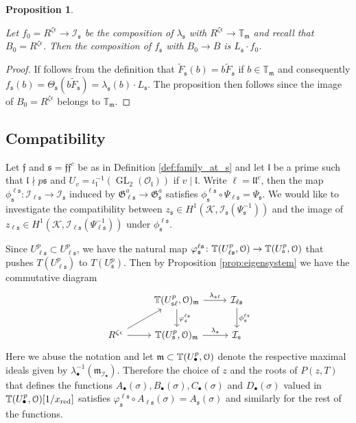 \documentclass[leqno]{amsart}
\newtheorem{prop}[thm]{Proposition}
\theoremstyle{definition}
\theoremstyle{remark}
\newcommand{\oo}{\mathcal{O}}
\newcommand{\eo}{\EuScript{O}}
\DeclareMathOperator{\GL}{GL}
\newcommand{\ff}{\mathfrak{f}}
\newcommand{\fl}{\mathfrak{l}}
\newcommand{\fm}{\mathfrak{m}}
\newcommand{\fs}{\mathfrak{s}}
\newcommand{\xx}{x_\textnormal{red}}
\newcommand{\K}{{\mathcal{K}}} %
\newcommand{\fG}{\mathfrak{G}}
\newcommand{\TT}{\mathbb{T}} %
\newcommand{\I}{\mathcal{I}} %
\begin{document}
\begin{prop}\label{prop:res_0}

Let $f_0=R^{\zeta\epsilon}\to \I_\fs$ 
be the composition of $\lambda_\fs$ with 
$R^{\zeta\epsilon}\to \TT_\fm$
and recall that $B_0=R^{\zeta\epsilon}$.
Then the composition of $f_\fs$ with
$B_0\to B$
is $L_\fs\cdot f_0$.
\end{prop}
\begin{proof}

If follows from the definition that 
$\tilde{F}_\fs(b)=b\tilde{F}_\fs$ if $b\in\TT_\fm$
and consequently 
$f_\fs(b)=\Theta_\fs(b\tilde{F}_\fs)=\lambda_{\fs}(b)\cdot L_\fs$.
The proposition then follows since the image of $B_0=R^{\zeta\epsilon}$
belongs to $\TT_\fm$.

\end{proof}










\subsection{Compatibility}

Let $\ff$ and $\fs=\ff\ff^c$ be as in 
Definition \ref{def:family_at_s}
and let $\fl$ be a prime such that
$\fl\nmid p\fs$ and $U_v=\iota_\fl^{-1}(\GL_2(\oo_\fl))$
if $v\mid \fl$.
Write $\ell=\fl\fl^c$, then the map
$\phi^{\ell\fs}_\fs\colon \I_{\ell\fs}\to \I_\fs$
induced by $\fG_{\ell\fs}^a\to \fG_\fs^a$
satisfies $\phi^{\ell\fs}_\fs\circ \Psi_{\ell\fs}=\Psi_{\fs}$.
We would like to investigate the compatibility 
between $z_{\fs}\in H^1(\K,\I_\fs(\Psi_{\fs}^{-1}))$
and the image of 
$z_{\ell\fs}\in H^1(\K,\I_{\ell\fs}(\Psi_{\ell\fs}^{-1}))$
under $\phi^{\ell\fs}_\fs$.

Since $U^p_{\ell\fs}\subset U^p_{\ell\fs}$,
we have the natural map
$\varphi^{\ell\fs}_{\fs}\colon 
\TT(U^p_{\ell\fs},\eo)\to \TT(U^p_{\fs},\eo)$
that pushes $T(U^p_{\ell\fs})$ to $T(U^p_{\fs})$.
Then by Proposition \ref{prop:eigensystem}
we have the commutative diagram
\[
\begin{tikzcd}
	& \TT(U^p_{\fs\ell},\eo)_\fm
    \arrow[d,"\varphi^{\ell\fs}_\fs"] \arrow[r,"\lambda_{\fs\ell}"]
    &\I_{\ell\fs} \arrow[d,"\phi^{\ell\fs}_\fs"]\\
	R^{\zeta\epsilon}\arrow[r]\arrow[ur]
	& \TT(U^p_\fs,\eo)_\fm \arrow[r,"\lambda_\fs"] &
    \I_\fs
\end{tikzcd}
\]
Here we abuse the notation
and let $\fm\subset \TT(U^p_\bullet,\eo)$
denote the respective maximal ideals 
given by $\lambda_\bullet^{-1}(\fm_{\I_{\bullet}})$.
Therefore the choice of $z$ and the roots of $P(z,T)$
that defines the functions
$A_\bullet(\sigma),B_\bullet(\sigma),
C_\bullet(\sigma)$ and $D_\bullet(\sigma)$
valued in $\TT(U^p_\bullet,\eo)[1/\xx]$ satisfies 
$\varphi^{\ell\fs}_\fs\circ A_{\ell\fs}(\sigma)=
A_\fs(\sigma)$ and similarly for the rest of the functions.
\end{document}
